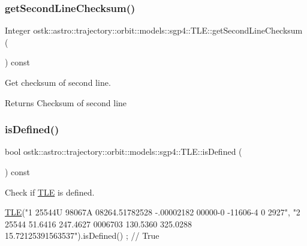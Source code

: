 \subsubsection{\texorpdfstring{get\+Second\+Line\+Checksum()}{getSecondLineChecksum()}}
{\footnotesize\ttfamily Integer ostk\+::astro\+::trajectory\+::orbit\+::models\+::sgp4\+::\+T\+L\+E\+::get\+Second\+Line\+Checksum (\begin{DoxyParamCaption}{ }\end{DoxyParamCaption}) const}



Get checksum of second line. 

\begin{DoxyReturn}{Returns}
Checksum of second line 
\end{DoxyReturn}
\mbox{\label{classostk_1_1astro_1_1trajectory_1_1orbit_1_1models_1_1sgp4_1_1_t_l_e_aa7fa1003a2b03fb7f3829bfdd342942f}} 
\subsubsection{\texorpdfstring{is\+Defined()}{isDefined()}}
{\footnotesize\ttfamily bool ostk\+::astro\+::trajectory\+::orbit\+::models\+::sgp4\+::\+T\+L\+E\+::is\+Defined (\begin{DoxyParamCaption}{ }\end{DoxyParamCaption}) const}



Check if \hyperlink{classostk_1_1astro_1_1trajectory_1_1orbit_1_1models_1_1sgp4_1_1_t_l_e}{T\+LE} is defined. 


\begin{DoxyCode}
\hyperlink{classostk_1_1astro_1_1trajectory_1_1orbit_1_1models_1_1sgp4_1_1_t_l_e_a57323db2c24577c2e8ddce79fa776d1e}{TLE}(\textcolor{stringliteral}{"1 25544U 98067A   08264.51782528 -.00002182  00000-0 -11606-4 0  2927"},
    \textcolor{stringliteral}{"2 25544  51.6416 247.4627 0006703 130.5360 325.0288 15.72125391563537"}).isDefined() ; \textcolor{comment}{// True}
\end{DoxyCode}


